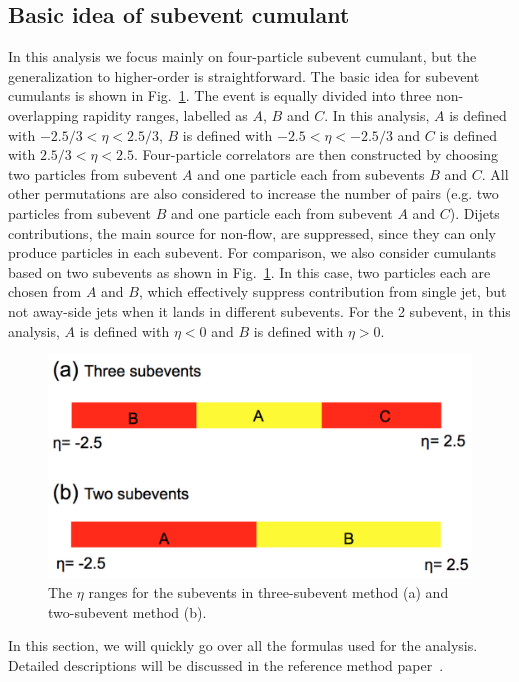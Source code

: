 \subsection{Basic idea of subevent cumulant}
In this analysis we focus mainly on four-particle subevent cumulant, but the generalization to higher-order is straightforward. The basic idea for subevent cumulants is shown in Fig.~\ref{fig:subevt_demo}. The event is equally divided into three non-overlapping rapidity ranges, labelled as $A$, $B$ and $C$. In this analysis, $A$ is defined with $-2.5/3<\eta<2.5/3$, $B$ is defined with $-2.5<\eta<-2.5/3$ and $C$ is defined with $2.5/3<\eta<2.5$. Four-particle correlators are then constructed by choosing two particles from subevent $A$ and one particle each from subevents $B$ and $C$. All other permutations are also considered to increase the number of pairs (e.g. two particles from subevent $B$ and one particle each from subevent $A$ and $C$). Dijets contributions, the main source for non-flow, are suppressed, since they can only produce particles in each subevent. For comparison, we also consider cumulants based on two subevents as shown in Fig.~\ref{fig:subevt_demo}. In this case, two particles each are chosen from $A$ and $B$, which effectively suppress contribution from single jet, but not away-side jets when it lands in different subevents. For the 2 subevent, in this analysis, $A$ is defined with $\eta<0$ and $B$ is defined with $\eta>0$.

\begin{figure}[H]
\centering
\includegraphics[width=0.7\columnwidth]{figs/sec_mtd/subevt_demo.png}
\caption{The $\eta$ ranges for the subevents in three-subevent method (a) and two-subevent method (b).}
\label{fig:subevt_demo}
\end{figure}

In this section, we will quickly go over all the formulas used for the analysis. Detailed descriptions will be discussed in the reference method paper~\cite{jjia}.

